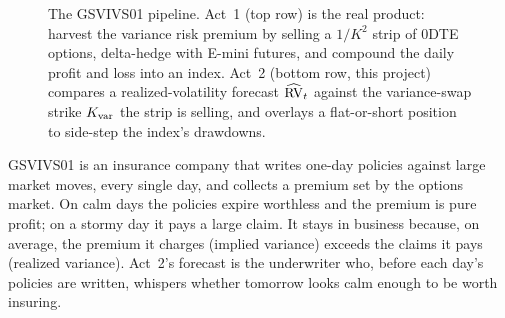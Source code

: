 \begin{figure}[ht]
\centering
{}
\caption{The GSVIVS01 pipeline. Act~1 (top row) is the real product: harvest the variance risk premium by selling a $1/K^2$ strip of 0DTE options, delta-hedge with E-mini futures, and compound the daily profit and loss into an index. Act~2 (bottom row, this project) compares a realized-volatility forecast $\widehat{\operatorname{RV}}_t$ against the variance-swap strike $K_{\mathrm{var}}$ the strip is selling, and overlays a flat-or-short position to side-step the index's drawdowns.}
\label{fig:gsvivs:pipeline}
\end{figure}

\begin{intuition}
GSVIVS01 is an insurance company that writes one-day policies against large market moves, every single day, and collects a premium set by the options market. On calm days the policies expire worthless and the premium is pure profit; on a stormy day it pays a large claim. It stays in business because, on average, the premium it charges (implied variance) exceeds the claims it pays (realized variance). Act~2's forecast is the underwriter who, before each day's policies are written, whispers whether tomorrow looks calm enough to be worth insuring.
\end{intuition}

